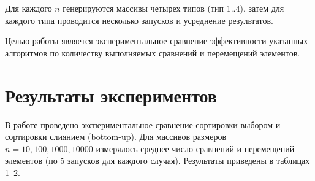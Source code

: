 \documentclass[a4paper,12pt]{article}
\begin{document}
Для каждого $n$ генерируются массивы четырех типов (тип 1..4), затем для каждого типа
проводится несколько запусков и усреднение результатов.

Целью работы является экспериментальное сравнение эффективности указанных
алгоритмов по количеству выполняемых сравнений и перемещений элементов.

\section{Результаты экспериментов}

В работе проведено экспериментальное сравнение сортировки выбором и сортировки слиянием (bottom-up). Для массивов размеров $n = 10, 100, 1000, 10000$ измерялось среднее число сравнений и перемещений элементов (по 5 запусков для каждого случая). Результаты приведены в таблицах 1–2.

\begin{table}[H]
\centering
\small
\renewcommand{\arraystretch}{1.15}
\setlength{\tabcolsep}{6pt}

\caption{Таблица 1: Результаты работы Selection Sort}
\end{table}
\end{document}
